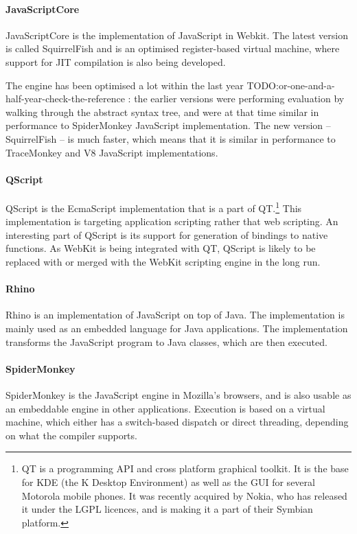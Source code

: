 \documentclass[11pt]{report}
\begin{document}
\paragraph{JavaScriptCore} 
JavaScriptCore \cite{webkit-src} is the implementation of JavaScript in Webkit.
The latest version is called SquirrelFish and is an optimised register-based virtual machine,
where support for JIT compilation is also being developed.

The engine has been optimised a lot within the last year TODO:or-one-and-a-half-year-check-the-reference \cite{squirrelfish-bench}: the earlier versions were performing evaluation by walking through the abstract syntax tree, and were at that time similar in performance to SpiderMonkey JavaScript implementation.
The new version -- SquirrelFish -- is much faster, which means that it is similar in performance to TraceMonkey and V8 JavaScript implementations.

\paragraph{QScript}
QScript \cite{qt} is the EcmaScript implementation that is a part of QT.\footnote{QT is a programming API and cross platform graphical toolkit. It is the base for KDE (the K Desktop Environment) as well as the GUI for several Motorola mobile phones. It was recently acquired by Nokia, who has released it under the LGPL licences, and is making it a part of their Symbian platform.} This implementation is targeting application scripting rather that web scripting. An interesting part of QScript is its support for generation of bindings to native functions. As WebKit is being integrated with QT, QScript is likely to be replaced with or merged with the WebKit scripting engine in the long run.

\paragraph{Rhino}
Rhino \cite{rhino} is an implementation of JavaScript on top of Java. The implementation is mainly used as an embedded language for Java applications. The implementation transforms the JavaScript program to Java classes, which are then executed.

\paragraph{SpiderMonkey}
\label{spidermonkey}
SpiderMonkey \cite{spidermonkey} is the JavaScript engine in Mozilla's browsers, and is also usable as an embeddable engine in other applications. Execution is based on a virtual machine, which either has a switch-based dispatch or direct threading, depending on what the compiler supports. %
\end{document}
